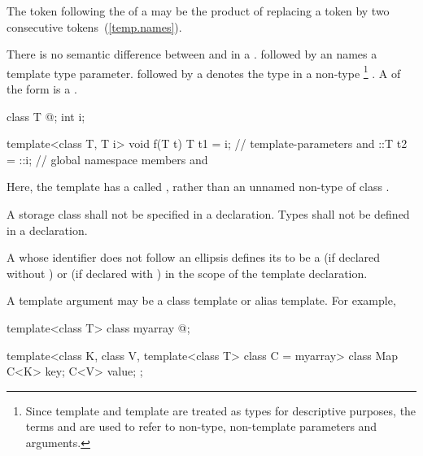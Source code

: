 \begin{bnf}
\br
  \br
\end{bnf}

\begin{note} The \tcode{>} token following the
 of a
may be the product of replacing a
\tcode{>{>}} token by two consecutive \tcode{>}
tokens~(\ref{temp.names}).\end{note}

\pnum
There is no semantic difference between
and
in a
.
followed by an
names a template type parameter.
followed by a
denotes the type in a non-type%
\footnote{Since template
and template
are treated as types for descriptive purposes, the terms
and
are used to refer to non-type, non-template parameters and arguments.}
.
A  of the form
  is a .
\begin{example}
\begin{codeblock}
  class T { @\commentellip@ };
  int i;

  template<class T, T i> void f(T t) {
    T t1 = i;      // template-parameters  and 
    ::T t2 = ::i;  // global namespace members  and 
  }
\end{codeblock}

Here, the template  has a 
called , rather than an unnamed non-type
 of class .
\end{example}
A storage class shall not be specified in a
declaration.
Types shall not be defined in a 
declaration.

\pnum
A
whose identifier does not follow an ellipsis
defines its
to be a
(if declared without
)
or
(if declared with
)
in the scope of the template declaration.
\begin{note}
A template argument may be a class template or alias template.
For example,

\begin{codeblock}
template<class T> class myarray { @\commentellip@ };

template<class K, class V, template<class T> class C = myarray>
class Map {
  C<K> key;
  C<V> value;
};
\end{codeblock}
\end{note}

